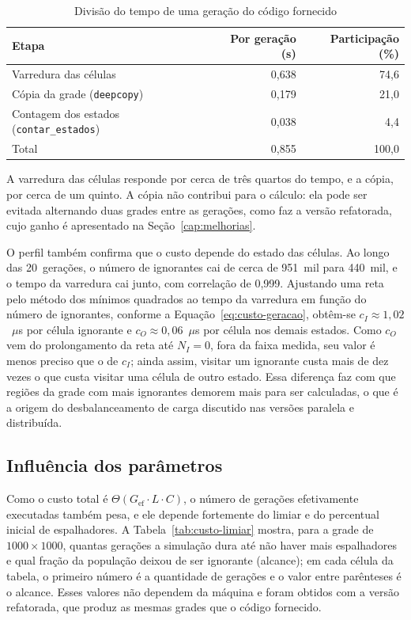 \begin{table}[htb]
    \centering
    \caption{Divisão do tempo de uma geração do código fornecido}
    \label{tab:custo-perfil}
    \begin{tabular}{lrr}
        \toprule
        \textbf{Etapa} & \textbf{Por geração (s)} & \textbf{Participação (\%)} \\
        \midrule
        Varredura das células                           & 0,638 & 74,6 \\
        Cópia da grade (\texttt{deepcopy})              & 0,179 & 21,0 \\
        Contagem dos estados (\texttt{contar\_estados}) & 0,038 & 4,4 \\
        \midrule
        Total                                          & 0,855 & 100,0 \\
        \bottomrule
    \end{tabular}
    \fonte{}
\end{table}

A varredura das células responde por cerca de três quartos do tempo, e a cópia, por cerca de um quinto. A cópia não contribui para o cálculo: ela pode ser evitada alternando duas grades entre as gerações, como faz a versão refatorada, cujo ganho é apresentado na Seção~\ref{cap:melhorias}.

O perfil também confirma que o custo depende do estado das células. Ao longo das 20~gerações, o número de ignorantes cai de cerca de 951~mil para 440~mil, e o tempo da varredura cai junto, com correlação de 0,999. Ajustando uma reta pelo método dos mínimos quadrados ao tempo da varredura em função do número de ignorantes, conforme a Equação~\ref{eq:custo-geracao}, obtêm-se $c_I \approx 1,02$~$\mu$s por célula ignorante e $c_O \approx 0,06$~$\mu$s por célula nos demais estados. Como $c_O$ vem do prolongamento da reta até $N_I = 0$, fora da faixa medida, seu valor é menos preciso que o de $c_I$; ainda assim, visitar um ignorante custa mais de dez vezes o que custa visitar uma célula de outro estado. Essa diferença faz com que regiões da grade com mais ignorantes demorem mais para ser calculadas, o que é a origem do desbalanceamento de carga discutido nas versões paralela e distribuída.

\subsection{Influência dos parâmetros}\label{sub:custo-parametros}

Como o custo total é $\Theta(G_{\mathrm{ef}} \cdot L \cdot C)$, o número de gerações efetivamente executadas também pesa, e ele depende fortemente do limiar e do percentual inicial de espalhadores. A Tabela~\ref{tab:custo-limiar} mostra, para a grade de $1000 \times 1000$, quantas gerações a simulação dura até não haver mais espalhadores e qual fração da população deixou de ser ignorante (alcance); em cada célula da tabela, o primeiro número é a quantidade de gerações e o valor entre parênteses é o alcance. Esses valores não dependem da máquina e foram obtidos com a versão refatorada, que produz as mesmas grades que o código fornecido.

